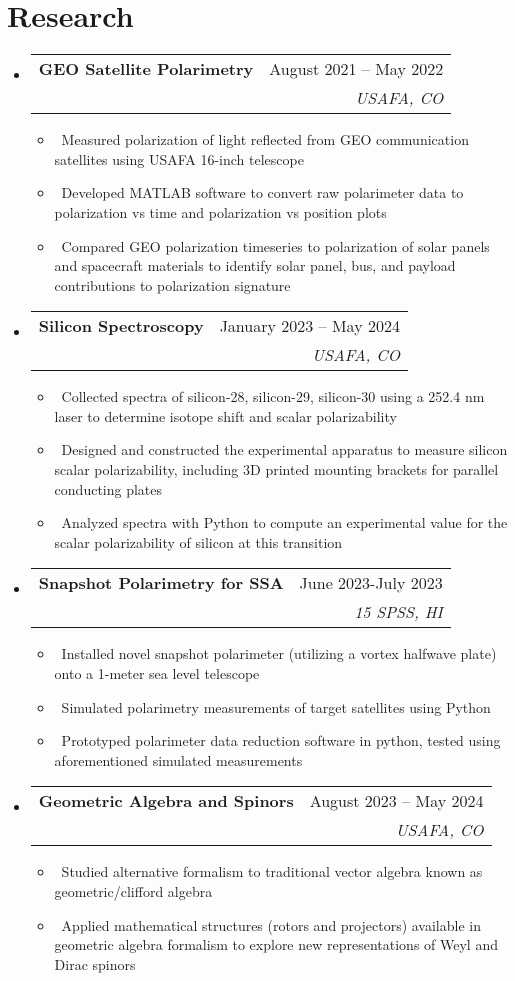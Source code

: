 \documentclass[letterpaper,10pt]{article}
\makeatletter
\newcommand{\resumeItem}[1]{\item\small{#1}}
\newcommand{\resumeSubheading}[4]{
\vspace{-1pt}\item
  \begin{tabular*}{0.97\textwidth}[t]{l@{\extracolsep{\fill}}r}
    \textbf{#1} & #2 \\
    \textit{#3} & \textit{#4} \\
  \end{tabular*}\vspace{-7pt}
}
\newcommand{\resumeSubHeadingList}{\begin{itemize}[leftmargin=0.15in, label={}]}
\newcommand{\resumeSubHeadingListEnd}{\end{itemize}}
\makeatother
\begin{document}
\section{Research}
\resumeSubHeadingList
  \resumeSubheading
      {GEO Satellite Polarimetry}{August 2021 -- May 2022}{}{USAFA, CO}
      \resumeSubHeadingList
		  	\resumeItem{\textbullet\ Measured polarization of light reflected from GEO communication satellites using USAFA 16-inch telescope}
          	\resumeItem{\textbullet\ Developed MATLAB software to convert raw polarimeter data to polarization vs time and polarization vs position plots}
          	\resumeItem{\textbullet\ Compared GEO polarization timeseries to polarization of solar panels and spacecraft materials to identify solar panel, bus, and payload contributions to polarization signature}
      \resumeSubHeadingListEnd
  \resumeSubheading
      {Silicon Spectroscopy}{January 2023 -- May 2024} 
      {}{USAFA, CO}
      \resumeSubHeadingList
			\resumeItem{\textbullet\ Collected spectra of silicon-28, silicon-29, silicon-30 using a 252.4 nm laser to determine isotope shift and scalar polarizability}
			\resumeItem{\textbullet\ Designed and constructed the experimental apparatus to measure silicon scalar polarizability, including 3D printed mounting brackets for parallel conducting plates}
			\resumeItem{\textbullet\ Analyzed spectra with Python to compute an experimental value for the scalar polarizability of silicon at this transition}
		\resumeSubHeadingListEnd	 
	\resumeSubheading{Snapshot Polarimetry for SSA}{June 2023-July 2023}{}{15 SPSS, HI}
		\resumeSubHeadingList
			\resumeItem{\textbullet\ Installed novel snapshot polarimeter (utilizing a vortex halfwave plate) onto a 1-meter sea level telescope}
			\resumeItem{\textbullet\ Simulated polarimetry measurements of target satellites using Python}
			\resumeItem{\textbullet\ Prototyped polarimeter data reduction software in python, tested using aforementioned simulated measurements}
		\resumeSubHeadingListEnd
	\resumeSubheading{Geometric Algebra and Spinors}{August 2023 -- May 2024}{}{USAFA, CO}
		\resumeSubHeadingList
			\resumeItem{\textbullet\ Studied alternative formalism to traditional vector algebra known as geometric/clifford algebra}
			\resumeItem{\textbullet\ Applied mathematical structures (rotors and projectors) available in geometric algebra formalism to explore new representations of Weyl and Dirac spinors}
		\resumeSubHeadingListEnd
	\resumeSubHeadingListEnd
\end{document}
